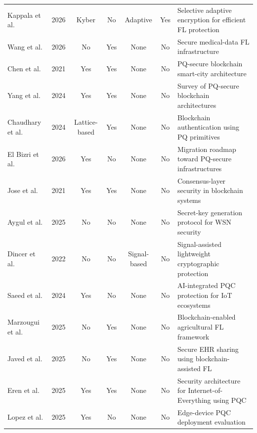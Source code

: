 \documentclass[journal, 10pt, twocolumn]{IEEEtran}
\begin{document}
\begin{table}[htbp]
\begin{tabularx}{\textwidth}{l c c c c c X}
Kappala et al. \cite{kappala2026}
& 2026 & Kyber & No & Adaptive & Yes
& Selective adaptive encryption for efficient FL protection \\

Wang et al. \cite{wang2026}
& 2026 & No & Yes & None & No
& Secure medical-data FL infrastructure \\

Chen et al. \cite{chen2021}
& 2021 & Yes & Yes & None & No
& PQ-secure blockchain smart-city architecture \\

Yang et al. \cite{yang2024_survey1}
& 2024 & Yes & Yes & None & No
& Survey of PQ-secure blockchain architectures \\

Chaudhary et al. \cite{chaudhary2024}
& 2024 & Lattice-based & Yes & None & No
& Blockchain authentication using PQ primitives \\

El Bizri et al. \cite{elbizri2026}
& 2026 & Yes & No & None & No
& Migration roadmap toward PQ-secure infrastructures \\

Jose et al. \cite{jose2021}
& 2021 & Yes & Yes & None & No
& Consensus-layer security in blockchain systems \\

Aygul et al. \cite{aygul2025}
& 2025 & No & No & None & No
& Secret-key generation protocol for WSN security \\

Dincer et al. \cite{dincer2022}
& 2022 & No & No & Signal-based & No
& Signal-assisted lightweight cryptographic protection \\

Saeed et al. \cite{saeed2024}
& 2024 & Yes & No & None & No
& AI-integrated PQC protection for IoT ecosystems \\

Marzougui et al. \cite{marzougui2025}
& 2025 & No & Yes & None & No
& Blockchain-enabled agricultural FL framework \\

Javed et al. \cite{javed2025}
& 2025 & No & Yes & None & No
& Secure EHR sharing using blockchain-assisted FL \\

Eren et al. \cite{eren2025}
& 2025 & Yes & Yes & None & No
& Security architecture for Internet-of-Everything using PQC \\

Lopez et al. \cite{lopez2025}
& 2025 & Yes & No & None & No
& Edge-device PQC deployment evaluation \\


\end{tabularx}
\end{table}
\end{document}
